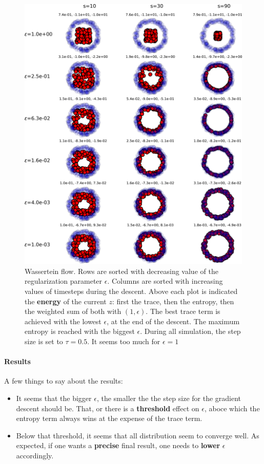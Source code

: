 \begin{figure}[p]
    \centering
    \includegraphics[width=\textwidth]{samples/4/wassertein_flow_for_various_eps.png}
    \caption{Wassertein flow. Rows are sorted with decreasing value of the regularization parameter $\epsilon$. Columns are sorted with increasing values of timesteps during the descent. Above each plot is indicated the \textbf{energy} of the current $z$: first the trace, then the entropy, then the weighted sum of both with $(1, \epsilon)$. The best trace term is achieved with the lowest $\epsilon$, at the end of the descent. The maximum entropy is reached with the biggest $\epsilon$. During all simulation, the step size is set to $\tau=0.5$. It seems too much for $\epsilon=1$}
    \label{fig:wassertein_flows_for_various_eps}
\end{figure}

\paragraph{Results} A few things to say about the results:
\begin{itemize}
    \item It seems that the bigger $\epsilon$, the smaller the the step size for the gradient descent should be. That, or there is a \textbf{threshold} effect on $\epsilon$, aboce which the entropy term always wins at the expense of the trace term.
    \item Below that threshold, it seems that all distribution seem to converge well. As expected, if one wants a \textbf{precise} final result, one needs to \textbf{lower} $\epsilon$ accordingly.
\end{itemize}

